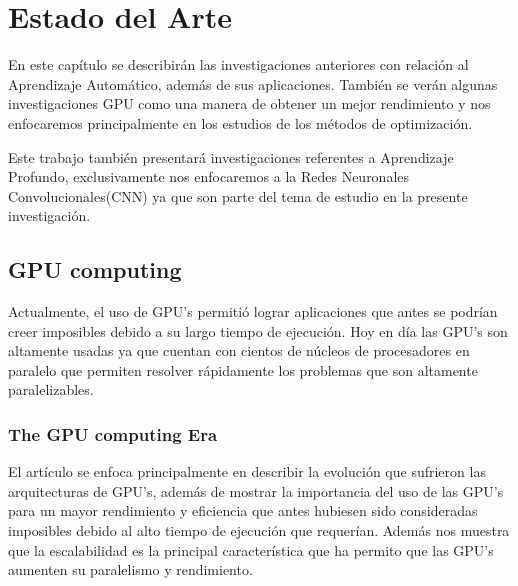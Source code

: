 \chapter{Estado del Arte}
En este capítulo se describirán las investigaciones anteriores con relación al Aprendizaje Automático, además de sus aplicaciones. También se verán algunas investigaciones GPU como una manera de obtener un mejor rendimiento y nos enfocaremos principalmente en los estudios de los métodos de optimización.

Este trabajo también presentará investigaciones referentes a Aprendizaje Profundo, exclusivamente nos enfocaremos a la Redes Neuronales Convolucionales(CNN) ya que son parte del tema de estudio en la presente investigación.





\section{GPU computing}
Actualmente, el uso de GPU's permitió lograr aplicaciones que antes se podrían creer imposibles debido a su largo tiempo de ejecución. Hoy en día las GPU's son altamente usadas ya que cuentan con cientos de núcleos de procesadores en paralelo que permiten resolver rápidamente los problemas que son altamente paralelizables.
\subsection{The GPU computing Era}
	El artículo se enfoca principalmente en describir la evolución que sufrieron las arquitecturas de GPU's, además de mostrar la importancia del uso de las GPU's para un mayor rendimiento y eficiencia que antes hubiesen sido consideradas imposibles debido al alto tiempo de ejecución que requerían. Además nos muestra que la escalabilidad es la principal característica que ha permito que las GPU's aumenten su paralelismo y rendimiento.
